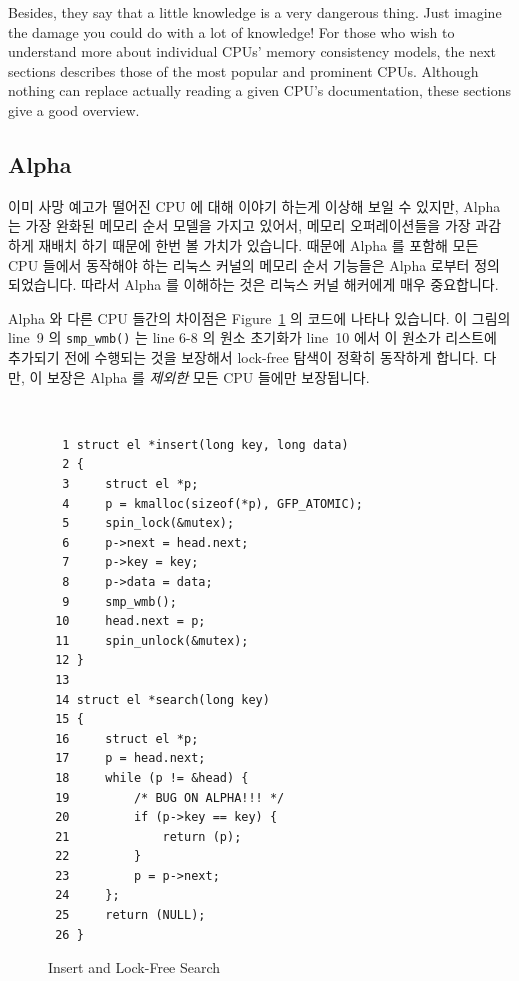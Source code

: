 Besides, they say that a little knowledge is a very dangerous thing.
Just imagine the damage you could do with a lot of knowledge!
For those who wish to understand more about individual CPUs'
memory consistency models, the next sections describes those of the
most popular and prominent CPUs.
Although nothing can replace actually reading a given CPU's documentation,
these sections give a good overview.
\fi

\subsection{Alpha}

이미 사망 예고가 떨어진 CPU 에 대해 이야기 하는게 이상해 보일 수 있지만, Alpha
는 가장 완화된 메모리 순서 모델을 가지고 있어서, 메모리 오퍼레이션들을 가장
과감하게 재배치 하기 때문에 한번 볼 가치가 있습니다.
때문에 Alpha 를 포함해 모든 CPU 들에서 동작해야 하는 리눅스 커널의 메모리 순서
기능들은 Alpha 로부터 정의되었습니다.
따라서 Alpha 를 이해하는 것은 리눅스 커널 해커에게 매우 중요합니다.

Alpha 와 다른 CPU 들간의 차이점은
Figure~\ref{fig:app:whymb:Insert and Lock-Free Search} 의 코드에 나타나
있습니다.
이 그림의 line~9 의 {\tt smp\_wmb()} 는 line 6-8 의 원소 초기화가 line~10 에서
이 원소가 리스트에 추가되기 전에 수행되는 것을 보장해서 lock-free 탐색이 정확히
동작하게 합니다.
다만, 이 보장은 Alpha 를 {\em 제외한} 모든 CPU 들에만 보장됩니다.

\begin{figure}
{\tt \scriptsize
\begin{verbatim}
  1 struct el *insert(long key, long data)
  2 {
  3     struct el *p;
  4     p = kmalloc(sizeof(*p), GFP_ATOMIC);
  5     spin_lock(&mutex);
  6     p->next = head.next;
  7     p->key = key;
  8     p->data = data;
  9     smp_wmb();
 10     head.next = p;
 11     spin_unlock(&mutex);
 12 }
 13
 14 struct el *search(long key)
 15 {
 16     struct el *p;
 17     p = head.next;
 18     while (p != &head) {
 19         /* BUG ON ALPHA!!! */
 20         if (p->key == key) {
 21             return (p);
 22         }
 23         p = p->next;
 24     };
 25     return (NULL);
 26 }
\end{verbatim}
}
\caption{Insert and Lock-Free Search}
\label{fig:app:whymb:Insert and Lock-Free Search}
\end{figure}

